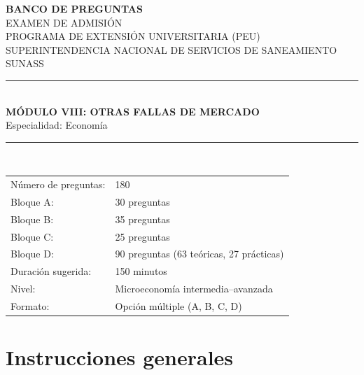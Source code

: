 \documentclass[11pt,a4paper]{article}
\begin{document}
\begin{titlepage}
\thispagestyle{empty}
\centering
\backboneportadaheader

{\Large\bfseries BANCO DE PREGUNTAS}\\[0.35cm]
{\large EXAMEN DE ADMISIÓN}\\[0.15cm]
{\large PROGRAMA DE EXTENSIÓN UNIVERSITARIA (PEU)}\\[0.15cm]
{\large SUPERINTENDENCIA NACIONAL DE SERVICIOS DE SANEAMIENTO}\\[0.05cm]
{\large SUNASS}\\[1.0cm]

\rule{\linewidth}{0.9pt}\\[0.55cm]
{\LARGE\bfseries MÓDULO VIII: OTRAS FALLAS DE MERCADO}\\[0.35cm]
{\large Especialidad: Economía}\\[0.55cm]
\rule{\linewidth}{0.9pt}\\[1.0cm]

\begin{tabular}{ll}
\toprule
Número de preguntas: & 180 \\
Bloque A: & 30 preguntas \\
Bloque B: & 35 preguntas \\
Bloque C: & 25 preguntas \\
Bloque D: & 90 preguntas (63 teóricas, 27 prácticas) \\
Duración sugerida: & 150 minutos \\
Nivel: & Microeconomía intermedia--avanzada \\
Formato: & Opción múltiple (A, B, C, D) \\
\bottomrule
\end{tabular}

\vfill
\backboneportadafooter
\end{titlepage}

\section*{Instrucciones generales}
\end{document}
